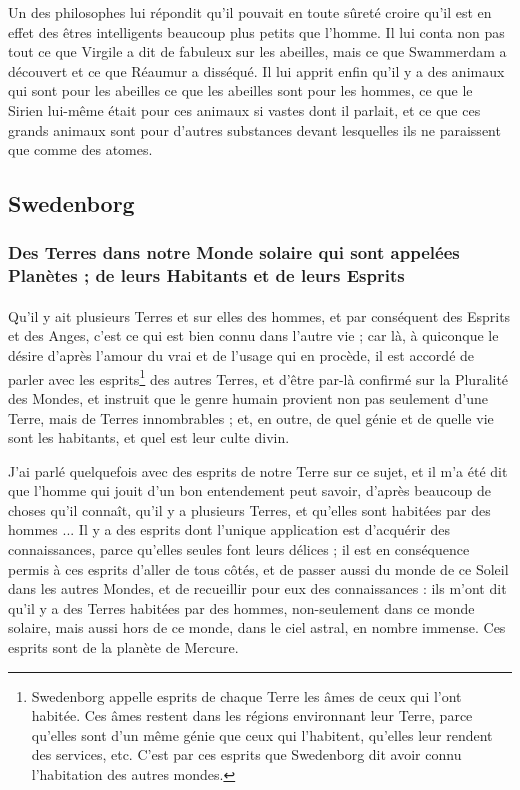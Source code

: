 \documentclass[a4paper, 11pt, oneside, landscape]{article}
\begin{document}
Un des philosophes lui répondit qu'il pouvait en toute sûreté croire qu'il est en effet des êtres intelligents beaucoup plus petits que l'homme. Il lui conta non pas tout ce que Virgile a dit de fabuleux sur les abeilles, mais ce que Swammerdam a découvert et ce que Réaumur a disséqué. Il lui apprit enfin qu'il y a des animaux qui sont pour les abeilles ce que les abeilles sont pour les hommes, ce que le Sirien lui-même était pour ces animaux si vastes dont il parlait, et ce que ces grands animaux sont pour d'autres substances devant lesquelles ils ne paraissent que comme des atomes.
\clearpage
\subsection{Swedenborg}
\subsubsection{Des Terres dans notre Monde solaire qui sont appelées Planètes ; de leurs Habitants et de leurs Esprits}
\paragraph{}
Qu'il y ait plusieurs Terres et sur elles des hommes, et par conséquent des Esprits et des Anges, c'est ce qui est bien connu dans l'autre vie ; car là, à quiconque le désire d'après l'amour du vrai et de l'usage qui en procède, il est accordé de parler avec les esprits\footnote{Swedenborg appelle esprits de chaque Terre les âmes de ceux qui l'ont habitée. Ces âmes restent dans les régions environnant leur Terre, parce qu'elles sont d'un même génie que ceux qui l'habitent, qu'elles leur rendent des services, etc. C'est par ces esprits que Swedenborg dit avoir connu l'habitation des autres mondes.} des autres Terres, et d'être par-là confirmé sur la Pluralité des Mondes, et instruit que le genre humain provient non pas seulement d'une Terre, mais de Terres innombrables ; et, en outre, de quel génie et de quelle vie sont les habitants, et quel est leur culte divin.

J'ai parlé quelquefois avec des esprits de notre Terre sur ce sujet, et il m'a été dit que l'homme qui jouit d'un bon entendement peut savoir, d'après beaucoup de choses qu'il connaît, qu'il y a plusieurs Terres, et qu'elles sont habitées par des hommes ... Il y a des esprits dont l'unique application est d'acquérir des connaissances, parce qu'elles seules font leurs délices ; il est en conséquence permis à ces esprits d'aller de tous côtés, et de passer aussi du monde de ce Soleil dans les autres Mondes, et de recueillir pour eux des connaissances : ils m'ont dit qu'il y a des Terres habitées par des hommes, non-seulement dans ce monde solaire, mais aussi hors de ce monde, dans le ciel astral, en nombre immense. Ces esprits sont de la planète de Mercure.
\end{document}
